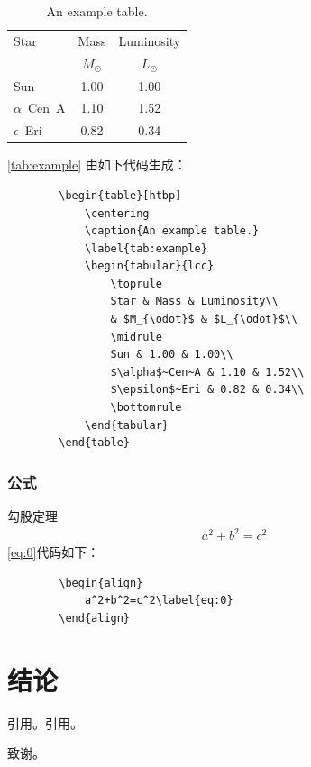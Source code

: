 \documentclass{YNUbachelor}
\begin{document}
	\begin{table}[htbp]
		\centering
		\caption{An example table.}
		\label{tab:example}
		\begin{tabular}{lcc}
			\toprule
			Star & Mass & Luminosity\\
			& $M_{\odot}$ & $L_{\odot}$\\
			\midrule
			Sun & 1.00 & 1.00\\
			$\alpha$~Cen~A & 1.10 & 1.52\\
			$\epsilon$~Eri & 0.82 & 0.34\\
			\bottomrule
		\end{tabular}
	\end{table}
	\autoref{tab:example} 由如下代码生成：
	\begin{verbatim}
		\begin{table}[htbp]
			\centering
			\caption{An example table.}
			\label{tab:example}
			\begin{tabular}{lcc}
				\toprule
				Star & Mass & Luminosity\\
				& $M_{\odot}$ & $L_{\odot}$\\
				\midrule
				Sun & 1.00 & 1.00\\
				$\alpha$~Cen~A & 1.10 & 1.52\\
				$\epsilon$~Eri & 0.82 & 0.34\\
				\bottomrule
			\end{tabular}
		\end{table}
	\end{verbatim}

	\subsubsection{公式}
	
	勾股定理
	\begin{align}
		a^2+b^2=c^2\label{eq:0}
	\end{align}
	\autoref{eq:0}代码如下：
	\begin{verbatim}
		\begin{align}
			a^2+b^2=c^2\label{eq:0}
		\end{align}
	\end{verbatim}
	
	\section{结论}
	引用\cite{向守平2008天体物理概论}。引用\cite{BQC_2020}。
	\begin{acknowledgement}
		致谢。
	\end{acknowledgement}

	\begin{reference}
	\end{reference}
	
	\backcover%
\end{document}
